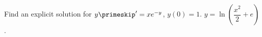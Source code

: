 {Find an explicit solution for $y\primeskip' = xe^{-y}$, $y(0)=1$.}
{$y=\ln\left(\dfrac{x^2}{2}+e\right)$.}